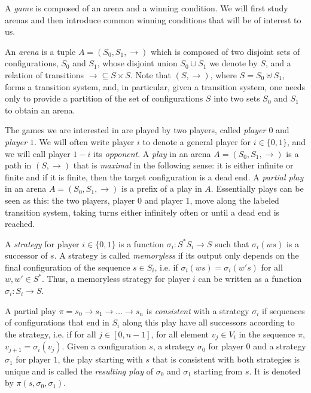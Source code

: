 \documentclass[a4paper,UKenglish,cleveref, autoref, thm-restate]{lipics-v2021}
\begin{document}
A {\em game} is composed of an arena and a winning condition.
We will ﬁrst study
arenas and
 then introduce common winning conditions that will be of interest to us.



An {\em arena} is a tuple $A=(S_0, S_1,{\rightarrow})$  which is composed of two  disjoint  sets of configurations, $S_0$ and $S_1$, 
	whose disjoint union $S_0 \cup S_1$ we denote by $S$, and
 a relation of  
		transitions
	 ${\rightarrow} \subseteq S \times 	S$. 
Note that $(S,{\rightarrow})$, where $S=S_0 \uplus S_1$, forms
a   
transition system, and, in particular, given a  
transition system,
one needs only to provide 
a partition of the set of configurations $S$ into two sets $S_0$ and $S_1$ to obtain an arena.

The games we are interested in are played by two players, called {\em player $0$} and {\em player $1$}. We will often write player $i$ to denote a general player for $i \in \{0,1 \}$,
and we will call player $1-i$ its {\em opponent}. 
A {\em play} in an arena $A=(S_0,S_1,\rightarrow)$ is a path in $(S,{\rightarrow})$ that is {\em maximal} in the following sense: it is either infinite or finite and if it is finite, then the target configuration is a dead end. 
A {\em partial play} in an arena $A=(S_0,S_1,\rightarrow)$ is a 
prefix of a play in $A$.
Essentially plays can be seen as this: the two players, player $0$ and player $1$, move along the labeled transition system, taking turns either inﬁnitely often or until a dead end is reached.





A {\em strategy} for player $i \in \{ 0,1\}$ is a function $\sigma_i : S^* S_i \to S$ such
that $\sigma_i(ws)$ is a successor of $s$.
%
A strategy is called {\em memoryless} if its output only depends on the final configuration of the sequence $s \in S_i$, i.e. if $\sigma_i(ws) = \sigma_i(w's)$ for all $w,w' \in S^*$. Thus, a memoryless strategy for player $i$ can be written  as a function $\sigma_i: S_i \to S$.

A partial play $\pi = s_0 \rightarrow s_1 \rightarrow \ldots \rightarrow s_n$ is {\em consistent} with a strategy $\sigma_i$ if sequences of configurations that end in $S_i$ along this play have all successors according to the strategy, i.e.
if for all $j\in[0,n-1]$, for all element $v_j \in V_i$ in the sequence $\pi$,
$v_{j+1} = \sigma_i(v_j)$.
 Given a configuration $s$,   a strategy $\sigma_0$ for player $0$ and a strategy $\sigma_1$ for player $1$, the play starting with $s$ that is consistent with both strategies is unique and is called the {\em resulting play} of $\sigma_0$ and $\sigma_1$ starting from $s$. It is 
denoted by $\pi(s, \sigma_0, \sigma_1)$.
\end{document}
